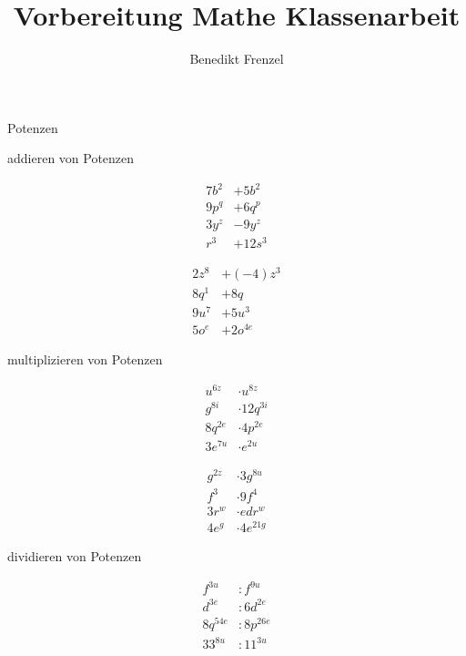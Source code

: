\documentclass[12pt]{article}
\title{Vorbereitung Mathe Klassenarbeit}
\author{Benedikt Frenzel}
\begin{document}
\begin{section}{Potenzen}
	\begin{subsection}{addieren von Potenzen}
	\begin{multicols}{2}
		\begin{align*}
			7b^{2}	&+		5b^{2}		\\
			9p^{q}	&+		6q^{p}		\\
			3y^{z}	&-		9y^{z}		\\
			r^{3}	&+		12s^{3}	
		\end{align*}

		\begin{align*}
			2z^{8}	&+		(-4)z^{3}	\\
			8q^{1}	&+		8q			\\
			9u^{7}	&+		5u^{3}		\\
			5o^{e}	&+		2o^{4e}
		\end{align*}
	\end{multicols}
	\end{subsection}
	
	\begin{subsection}{multiplizieren von Potenzen}
	\begin{multicols}{2}
		\begin{align*}
		u^{6z} 		&\cdot 	u^{8z}		\\
		g^{8i}		&\cdot	12q^{3i}	\\
		8q^{2e}		&\cdot	4p^{2e}		\\
		3e^{7u}		&\cdot	e^{2u}
		\end{align*}

		\begin{align*}
		g^{2z} 		&\cdot 	3g^{8u}		\\
		f^{3}		&\cdot	9f^{4}		\\
		3r^{w}		&\cdot	edr^{w}		\\
		4e^{g}		&\cdot	4e^{21g}
		\end{align*}
	\end{multicols}
	\end{subsection}
	
	\begin{subsection}{dividieren von Potenzen}
	\begin{multicols}{2}
		\begin{align*}
		f^{3u} 		&: 		f^{9u}		\\
		d^{3e}		&: 		6d^{2e}		\\
		8q^{54e}	&:		8p^{26e}	\\
		33^{8u}		&:		11^{3u}
		\end{align*}


\end{multicols}
\end{subsection}
\end{section}
\end{document}
